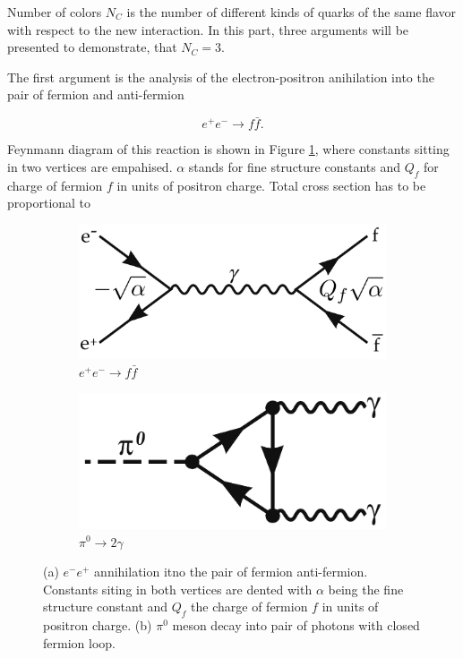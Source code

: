 Number of colors $N_C$ is the number of different kinds of quarks of the same
flavor with respect to the new interaction. In this part, three arguments will
be presented to demonstrate, that $N_C = 3$.

The first argument is the analysis of the electron-positron anihilation into the
pair of fermion and anti-fermion

\begin{equation}
  e^+e^- \rightarrow f\bar{f}.
  \label{ElectronPositronAnihilation}
\end{equation}

Feynmann diagram of this reaction is shown in Figure \ref{fig:RRatio}, where
constants sitting in two vertices are empahised.  $\alpha$ stands for fine
structure constants and $Q_f$ for charge of fermion $f$ in units of positron
charge. Total cross section has to be proportional to

\begin{figure}[h!]
  \centering
  \begin{subfigure}[b]{0.45\textwidth}
    \includegraphics[width=\textwidth]{Chapter1/RRatio.png} 
    \caption{$e^+e^- \rightarrow f\bar{f}$}
    \label{fig:RRatio}
  \end{subfigure}
  \quad
  \begin{subfigure}[b]{0.45\textwidth}
    \includegraphics[width=\textwidth]{Chapter1/PiMesonDecay.png}
    \caption{$\pi^0 \rightarrow 2 \gamma$}
    \label{fig:PiDecay}
  \end{subfigure}
  \caption{(a) $e^-e^+$ annihilation itno the pair of fermion anti-fermion.
    Constants siting in both vertices are dented with $\alpha$ being the fine
    structure constant and $Q_f$ the charge of fermion $f$ in units of positron
    charge.
           (b) $\pi^0$ meson decay into pair of photons with closed fermion
         loop.}
  \label{fig:FeynmannGraphsNC3}
\end{figure}

